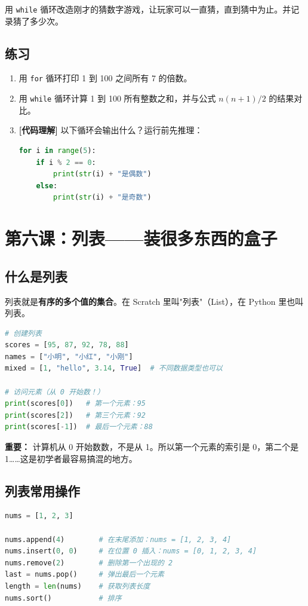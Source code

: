 \documentclass[a4paper,12pt]{ctexart}
\begin{document}
用 \texttt{while} 循环改造刚才的猜数字游戏，让玩家可以一直猜，直到猜中为止。并记录猜了多少次。

\subsection*{练习}

\begin{enumerate}
  \item 用 \texttt{for} 循环打印 1 到 100 之间所有 7 的倍数。
  \item 用 \texttt{while} 循环计算 1 到 100 所有整数之和，并与公式 $n(n+1)/2$ 的结果对比。
  \item \textbf{[代码理解]} 以下循环会输出什么？运行前先推理：
\begin{lstlisting}[language=Python]
for i in range(5):
    if i % 2 == 0:
        print(str(i) + "是偶数")
    else:
        print(str(i) + "是奇数")
\end{lstlisting}
\end{enumerate}

\section*{第六课：列表——装很多东西的盒子}

\subsection*{什么是列表}

列表就是\textbf{有序的多个值的集合}。在 Scratch 里叫"列表"（List），在 Python 里也叫列表。

\begin{lstlisting}[language=Python]
# 创建列表
scores = [95, 87, 92, 78, 88]
names = ["小明", "小红", "小刚"]
mixed = [1, "hello", 3.14, True]  # 不同数据类型也可以

# 访问元素（从 0 开始数！）
print(scores[0])   # 第一个元素：95
print(scores[2])   # 第三个元素：92
print(scores[-1])  # 最后一个元素：88
\end{lstlisting}

\textbf{重要：} 计算机从 0 开始数数，不是从 1。所以第一个元素的索引是 0，第二个是 1……这是初学者最容易搞混的地方。

\subsection*{列表常用操作}

\begin{lstlisting}[language=Python]
nums = [1, 2, 3]

nums.append(4)        # 在末尾添加：nums = [1, 2, 3, 4]
nums.insert(0, 0)     # 在位置 0 插入：nums = [0, 1, 2, 3, 4]
nums.remove(2)        # 删除第一个出现的 2
last = nums.pop()     # 弹出最后一个元素
length = len(nums)    # 获取列表长度
nums.sort()           # 排序
\end{lstlisting}
\end{document}
